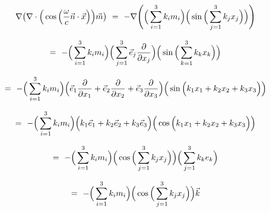 \documentclass{article}
\begin{document}
\begin{equation} \label{eb-eq-1-151}
\nabla \big( \nabla \cdot \Big( \cos \Big( \frac{\omega}{c} \vec{n} \cdot \vec{x} \Big) \Big) \vec{m} \big) \hspace{0.125cm} = \hspace{0.125cm} - \nabla \Bigg( \Big( \sum_{i = 1}^{3} k_i m_i \Big) \Big( \sin \Big( \sum_{j = 1}^{3} k_j x_j \Big) \Big) \Bigg) \hspace{0.125cm} 
\end{equation}

\begin{equation} \label{eb-eq-1-152}
= \hspace{0.125cm} - \Big( \sum_{i = 1}^{3} k_i m_i \Big) \Big( \sum_{j = 1}^{3} \vec{e}_j  \frac{\partial}{\partial{x_j}} \Big) \Big( \sin \Big( \sum_{k = 1}^{3} k_k x_k \Big) \Big) \hspace{0.125cm} 
\end{equation}

\begin{equation} \label{eb-eq-1-153}
= \hspace{0.125cm} - \Big( \sum_{i = 1}^{3} k_i m_i \Big) \Big( \vec{e}_1 \frac{\partial}{\partial{x_1}} + \vec{e}_2 \frac{\partial}{\partial{x_2}} + \vec{e}_3 \frac{\partial}{\partial{x_3}} \Big) \Big( \sin \Big( k_1 x_1 + k_2 x_2 + k_3 x_3 \Big) \Big) \hspace{0.125cm} 
\end{equation}

\begin{equation} \label{eb-eq-1-154}
= \hspace{0.125cm} - \Big( \sum_{i = 1}^{3} k_i m_i \Big) \Big( k_1 \vec{e}_1 + k_2 \vec{e}_2 + k_3 \vec{e}_3 \Big) \Big( \cos \Big( k_1 x_1 + k_2 x_2 + k_3 x_3 \Big) \Big) \hspace{0.125cm} 
\end{equation}

\begin{equation} \label{eb-eq-1-155}
= \hspace{0.125cm} - \Big( \sum_{i = 1}^{3} k_i m_i \Big) \Big( \cos \Big( \sum_{j = 1}^{3} k_j x_j \Big) \Big) \Big( \sum_{j = 1}^{3} k_k e_k \Big) \hspace{0.125cm} 
\end{equation}

\begin{equation} \label{eb-eq-1-156}
= \hspace{0.125cm} - \Big( \sum_{i = 1}^{3} k_i m_i \Big) \Big( \cos \Big( \sum_{j = 1}^{3} k_j x_j \Big) \Big) \vec{k} \hspace{0.125cm} 
\end{equation}
\end{document}
